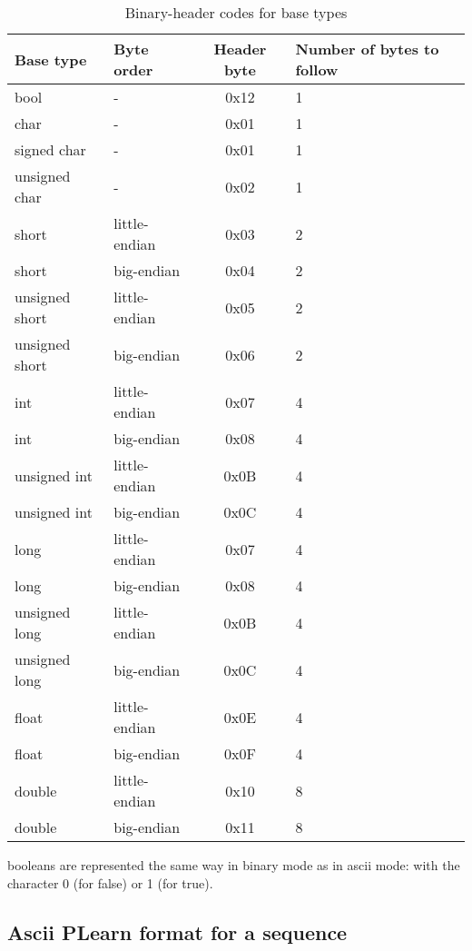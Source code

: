 \documentclass[11pt]{book}
\begin{document}
\begin{table}[h]
\caption{ Binary-header codes for base types }
\label{tab:base-types}
\begin{tabular}{|llcl|} \hline 
Base type      & Byte order    & Header byte & Number of bytes to follow \\ \hline 
bool           & -             & 0x12        & 1 \\
char           & -             & 0x01        & 1 \\
signed char    & -             & 0x01        & 1 \\
unsigned char  & -             & 0x02        & 1 \\
short          & little-endian & 0x03        & 2 \\
short          & big-endian    & 0x04        & 2 \\
unsigned short & little-endian & 0x05        & 2 \\
unsigned short & big-endian    & 0x06        & 2 \\
int            & little-endian & 0x07        & 4 \\
int            & big-endian    & 0x08        & 4 \\
unsigned int   & little-endian & 0x0B        & 4 \\
unsigned int   & big-endian    & 0x0C        & 4 \\
long           & little-endian & 0x07        & 4 \\
long           & big-endian    & 0x08        & 4 \\
unsigned long  & little-endian & 0x0B        & 4 \\
unsigned long  & big-endian    & 0x0C        & 4 \\
float          & little-endian & 0x0E        & 4 \\
float          & big-endian    & 0x0F        & 4 \\
double         & little-endian & 0x10        & 8 \\
double         & big-endian    & 0x11        & 8 \\ \hline 
\end{tabular}
\begin{center}
\end{center}
\end{table}

booleans are represented the same way in binary mode as in ascii mode: with the character 0 (for false) or 1 (for true).

\subsection{Ascii PLearn format for a sequence}
\label{ascii_sequence}
\end{document}
